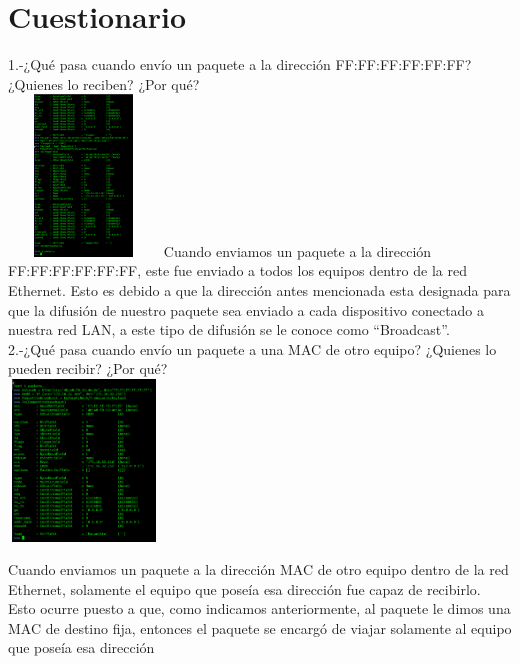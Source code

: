 \documentclass{udpreport}
\begin{document}
	\section{Cuestionario}
	
	  1.-¿Qué pasa cuando envío un paquete a la dirección FF:FF:FF:FF:FF:FF? ¿Quienes
	     lo reciben? ¿Por qué?\\
    			\includegraphics[width=4cm, height=4.3cm]{EnvioPaquetito.png}  
	     Cuando enviamos un paquete a la dirección FF:FF:FF:FF:FF:FF, este fue enviado a todos los equipos dentro de la red
	     Ethernet. Esto es debido a que la dirección antes mencionada esta designada para que la difusión de nuestro paquete sea
 	     enviado a cada dispositivo conectado a nuestra red LAN, a este tipo de difusión se le conoce como “Broadcast”.\\
 
  	  2.-¿Qué pasa cuando envío un paquete a una MAC de otro equipo? ¿Quienes lo
  	      pueden recibir? ¿Por qué?\\
    			\includegraphics[width=4cm, height=4.3cm]{EnvioPaquetitoMalo2.png}
 	      
 	      Cuando enviamos un paquete a la dirección MAC de otro equipo dentro de la red Ethernet, solamente el equipo que poseía
 	      esa dirección fue capaz de recibirlo. Esto ocurre puesto a que, como indicamos anteriormente, al paquete le dimos una
 	      MAC de destino fija, entonces el paquete se encargó de viajar solamente al equipo que poseía esa dirección\\
 
\end{document}
